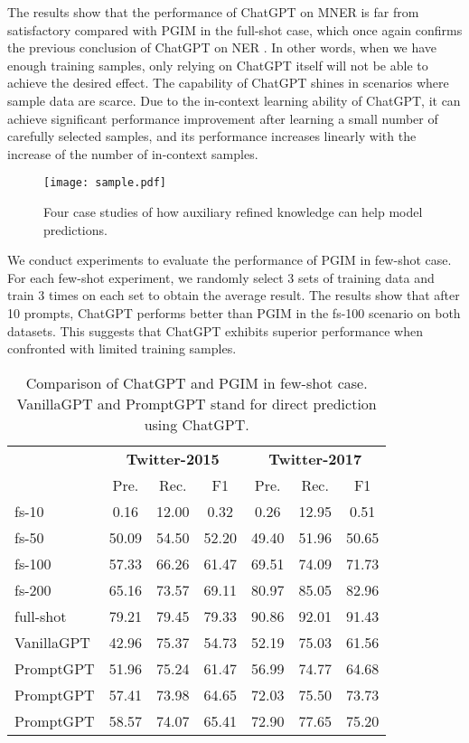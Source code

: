 \documentclass[11pt]{article}
\begin{document}
The results show that the performance of ChatGPT on MNER is far from satisfactory compared with PGIM in the full-shot case, which once again confirms the previous conclusion of ChatGPT on NER \citep{qin2023chatgpt}. 
In other words, when we have enough training samples, only relying on ChatGPT itself will not be able to achieve the desired effect.
The capability of ChatGPT shines in scenarios where sample data are scarce. 
Due to the in-context learning ability of ChatGPT, it can achieve significant performance improvement after learning a small number of carefully selected samples, and its performance increases linearly with the increase of the number of in-context samples. 
\begin{figure*}
	\centering
	\texttt{[image: sample.pdf]}
	\caption{Four case studies of how auxiliary refined knowledge can help model predictions.}
	\label{fig:cases}
\end{figure*}
We conduct experiments to evaluate the performance of PGIM in few-shot case. 
For each few-shot experiment, we randomly select 3 sets of training data and train 3 times on each set to obtain the average result. The results show that after 10 prompts, ChatGPT performs better than PGIM in the fs-100 scenario on both datasets. This suggests that ChatGPT exhibits superior performance when confronted with limited training samples.


\begin{table}[t!]
\small
\setlength\tabcolsep{2.3pt}
\renewcommand{\arraystretch}{1.2}
\centering
\begin{tabular}{l|cccccc}
\toprule
& \multicolumn{3}{c|}{\textbf{Twitter-2015}} & \multicolumn{3}{c}{\textbf{Twitter-2017}}\\
& Pre. & Rec. & \multicolumn{1}{c|}{F1}  & Pre. & Rec. & \multicolumn{1}{c}{F1}    \\
\midrule
fs-10      & 0.16  & 12.00 & \multicolumn{1}{c|}{0.32}  & 0.26  & 12.95 & 0.51  \\
fs-50      & 50.09 & 54.50 & \multicolumn{1}{c|}{52.20} & 49.40 & 51.96 & 50.65 \\
fs-100     & 57.33 & 66.26 & \multicolumn{1}{c|}{61.47} & 69.51 & 74.09 & 71.73 \\
fs-200     & 65.16 & 73.57 & \multicolumn{1}{c|}{69.11} & 80.97 & 85.05 & 82.96 \\
full-shot  & 79.21 & 79.45 & \multicolumn{1}{c|}{79.33} & 90.86 & 92.01 & 91.43 \\
\midrule
VanillaGPT & 42.96 & 75.37 & \multicolumn{1}{c|}{54.73} & 52.19 & 75.03 & 61.56\\
PromptGPT & 51.96 & 75.24 & \multicolumn{1}{c|}{61.47} & 56.99 & 74.77 & 64.68 \\
PromptGPT & 57.41 & 73.98 & \multicolumn{1}{c|}{64.65} & 72.03 & 75.50 & 73.73 \\
PromptGPT & 58.57 & 74.07 & \multicolumn{1}{c|}{65.41} & 72.90 & 77.65 & 75.20 \\
\bottomrule
\end{tabular}
\caption{Comparison of ChatGPT and PGIM in few-shot case. VanillaGPT and PromptGPT stand for direct prediction using ChatGPT.}
\label{tab:Prompt ChatGPT}
\end{table}
\end{document}
